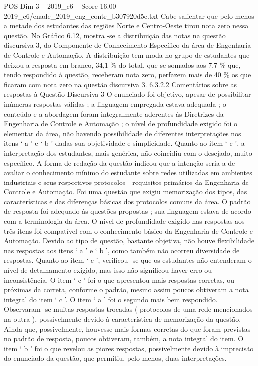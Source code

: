 \begin{textsample}{POS Dim 3 – 2019\_c6 – Score 16.00 – 2019\_c6/enade\_2019\_eng\_contr\_b307920d5e.txt}
Cabe salientar que pelo menos a metade dos estudantes das regiões Norte e Centro-Oeste tirou nota zero nessa questão.
No Gráfico 6.12, mostra -se a distribuição das notas na questão discursiva 3, do Componente de Conhecimento Específico da área de Engenharia de Controle e Automação.
A distribuição tem moda no grupo de estudantes que deixou a resposta em branco, 34,1 \% do total, que se somados aos 7,7 \% que, tendo respondido à questão, receberam nota zero, perfazem mais de 40 \% os que ficaram com nota zero na questão discursiva 3. 6.3.2.2 Comentários sobre as respostas à Questão Discursiva 3 O enunciado foi objetivo, apesar de possibilitar inúmeras respostas válidas ; a linguagem empregada estava adequada ; o conteúdo e a abordagem foram integralmente aderentes às Diretrizes da Engenharia de Controle e Automação ; o nível de profundidade exigido foi o elementar da área, não havendo possibilidade de diferentes interpretações nos itens ‘ a ’ e ‘ b ’ dadas sua objetividade e simplicidade.
Quanto ao item ‘ c ’, a interpretação dos estudantes, mais genérica, não coincidiu com o desejado, muito específico.
A forma de redação da questão indicou que a intenção seria a de avaliar o conhecimento mínimo do estudante sobre redes utilizadas em ambientes industriais e seus respectivos protocolos - requisitos primários da Engenharia de Controle e Automação.
Foi uma questão que exigiu memorização dos tipos, das características e das diferenças básicas dos protocolos comuns da área.
O padrão de resposta foi adequado às questões propostas ; sua linguagem estava de acordo com a terminologia da área.
O nível de profundidade exigido nas respostas aos três itens foi compatível com o conhecimento básico da Engenharia de Controle e Automação.
Devido ao tipo de questão, bastante objetiva, não houve flexibilidade nas respostas aos itens ‘ a ’ e ‘ b ’, como também não ocorreu diversidade de respostas.
Quanto ao item ‘ c ’, verificou -se que os estudantes não entenderam o nível de detalhamento exigido, mas isso não significou haver erro ou inconsistência.
O item ‘ c ’ foi o que apresentou mais respostas corretas, ou próximas da correta, conforme o padrão, mesmo assim poucos obtiveram a nota integral do item ‘ c ’.
O item ‘ a ’ foi o segundo mais bem respondido.
Observaram -se muitas respostas trocadas ( protocolos de uma rede mencionados na outra ), possivelmente devido à característica de memorização da questão.
Ainda que, possivelmente, houvesse mais formas corretas do que foram previstas no padrão de resposta, poucos obtiveram, também, a nota integral do item.
O item ‘ b ’ foi o que revelou as piores respostas, possivelmente devido à imprecisão do enunciado da questão, que permitiu, pelo menos, duas interpretações.

\end{textsample}
